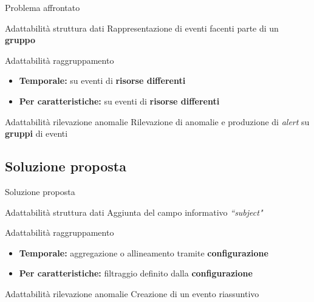 \documentclass{beamer}
\begin{document}
	\begin{frame}{Problema affrontato}

		\begin{alertblock}{Adattabilità struttura dati}
			Rappresentazione di eventi facenti parte di un \textbf{gruppo} \vspace{.5em}
		\end{alertblock} \vspace{.2em}
		
		\begin{alertblock}{Adattabilità raggruppamento}
			\begin{itemize}
				\item \textbf{Temporale:} su eventi di \textbf{risorse differenti} \vspace{.5em}
				\item \textbf{Per caratteristiche:} su eventi di \textbf{risorse differenti} \vspace{.5em}
			\end{itemize}
		\end{alertblock}
		
		\begin{alertblock}{Adattabilità rilevazione anomalie}
			Rilevazione di anomalie e produzione di \textit{alert} su \textbf{gruppi} di eventi \vspace{.5em} 
		\end{alertblock}
	\end{frame}
	
	\subsection{Soluzione proposta}

	\begin{frame}{Soluzione proposta}
		\begin{exampleblock}{Adattabilità struttura dati}
			Aggiunta del campo informativo \textit{``subject"} 
		\end{exampleblock}
		
		\begin{exampleblock}{Adattabilità raggruppamento}
			\begin{itemize}
				\item \textbf{Temporale:} aggregazione o allineamento tramite \textbf{configurazione}\vspace{.5em}
				\item \textbf{Per caratteristiche:} filtraggio definito dalla \textbf{configurazione}  \vspace{.5em}
			\end{itemize}
		\end{exampleblock}
		
		\begin{exampleblock}{Adattabilità rilevazione anomalie}
			Creazione di un evento riassuntivo
		\end{exampleblock}
	\end{frame}
	
\end{document}
